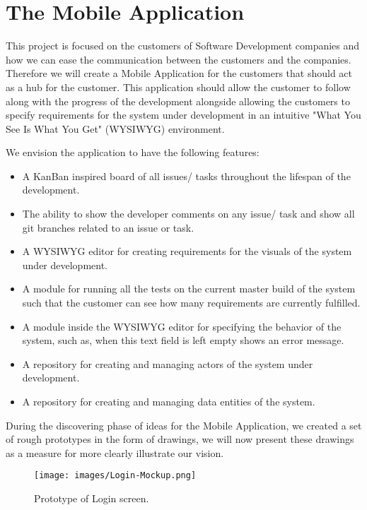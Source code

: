 \section{The Mobile Application}
This project is focused on the customers of Software Development companies and how we can ease the communication between the customers and the companies.
Therefore we will create a Mobile Application for the customers that should act as a hub for the customer. 
This application should allow the customer to follow along with the progress of the development alongside allowing the customers to specify requirements for the system under development in an intuitive "What You See Is What You Get" (WYSIWYG) environment.

We envision the application to have the following features:

\begin{itemize}
    \item A KanBan inspired board of all issues/ tasks throughout the lifespan of the development.
    \item The ability to show the developer comments on any issue/ task and show all git branches related to an issue or task.
    \item A WYSIWYG editor for creating requirements for the visuals of the system under development.
    \item A module for running all the tests on the current master build of the system such that the customer can see how many requirements are currently fulfilled.
    \item A module inside the WYSIWYG editor for specifying the behavior of the system, such as, when this text field is left empty shows an error message.
    \item A repository for creating and managing actors of the system under development.
    \item A repository for creating and managing data entities of the system.
\end{itemize}

During the discovering phase of ideas for the Mobile Application, we created a set of rough prototypes in the form of drawings, we will now present these drawings as a measure for more clearly illustrate our vision.

\begin{figure}[H]
    \texttt{[image: images/Login-Mockup.png]}
    \caption{Prototype of Login screen.}
\end{figure}

